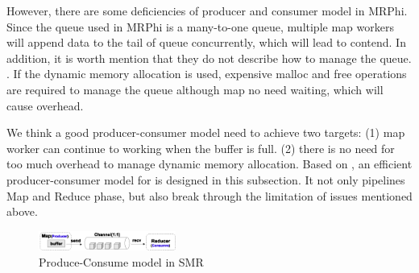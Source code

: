 However, there are some deficiencies of producer and consumer model in MRPhi.
Since the queue used in MRPhi is a many-to-one queue, multiple map workers will append data to the tail of queue  concurrently, which will lead to contend. 
In addition, it is worth mention that they do not describe how to manage the queue.
.
If the dynamic memory allocation is used,  expensive malloc and free operations are required to manage the queue although map no need waiting,  which will cause overhead.


We think a good producer-consumer model need to achieve two targets:
(1) map worker can continue to working when the buffer is full.
(2) there is no need for too much overhead to manage dynamic memory allocation.
Based on \myth, an efficient producer-consumer model for \myds is designed in this subsection.
It not only pipelines Map and Reduce phase, but also break through the limitation of issues  mentioned above. 

\begin{figure}[!h!t]  
	\centering
	\includegraphics[width=0.4\textwidth]{eps/dmr_channel.eps}
	\caption{Produce-Consume model in SMR}
	\label{fig:dmr:channel}
\end{figure}

